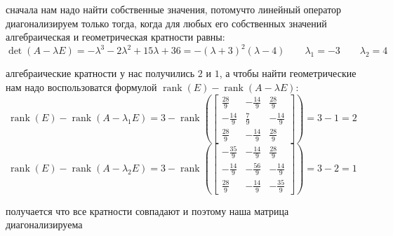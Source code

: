 \documentclass{article}
\renewcommand{\l}{\left}
\renewcommand{\r}{\right}
\DeclareMathOperator{\rank}{rank}
\begin{document}
  \noindent
  сначала нам надо найти собственные значения, потомучто линейный оператор диагонализируем только тогда,
  когда для любых его собственных значений алгебраическая и геометрическая кратности равны:
  $$ \det(A-\lambda E) = -\lambda^3 - 2\lambda^2 + 15\lambda + 36 = - \left(\lambda + 3\right)^{2} \left(\lambda - 4\right)  \qquad
  \lambda_1 = -3 \qquad \lambda_2 = 4 $$

  \noindent
  алгебраические кратности у нас получились $2$ и $1$,
  а чтобы найти геометрические нам надо воспользоватся формулой $ \rank(E) - \rank(A-\lambda E) $:
  $$ \rank(E) - \rank(A-\lambda_1 E) = 3 - \rank\l(\left[\begin{matrix}\frac{28}{9} & - \frac{14}{9} & \frac{28}{9}\\- \frac{14}{9} & \frac{7}{9} & - \frac{14}{9}\\\frac{28}{9} & - \frac{14}{9} & \frac{28}{9}\end{matrix}\right]\r) = 3-1 = 2 $$
  $$ \rank(E) - \rank(A-\lambda_2 E) = 3 - \rank\l(\left[\begin{matrix}- \frac{35}{9} & - \frac{14}{9} & \frac{28}{9}\\- \frac{14}{9} & - \frac{56}{9} & - \frac{14}{9}\\\frac{28}{9} & - \frac{14}{9} & - \frac{35}{9}\end{matrix}\right]\r) = 3-2 = 1 $$

  \noindent
  получается что все кратности совпадают и поэтому наша матрица диагонализируема
\end{document}
